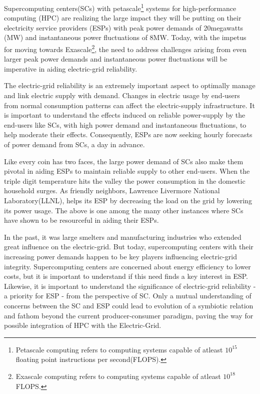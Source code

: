 Supercomputing centers(SCs) with petascale\footnote{Petascale computing refers to computing systems capable of atleast \(10^{15}\) floating point instructions per second(FLOPS).} systems for high-performance computing (HPC) are realizing the large impact they will be putting on their electricity service providers (ESPs) with peak power demands of 20megawatts (MW) and instantaneous power fluctuations of 8MW. 
Today, with the impetus for moving towards Exascale\footnote{Exascale computing refers to computing systems capable of atleast \(10^{18}\)FLOPS.}, the need to address challenges arising from even larger peak power demands and instantaneous power fluctuations will be imperative in aiding electric-grid reliability.

The electric-grid reliability is an extremely important aspect to optimally manage and link electric supply with demand. Changes in electric usage by end-users from normal consumption patterns can affect the electric-supply infrastructure. 
It is important to understand the effects induced on reliable power-supply by the end-users like SCs, with high power demand and instantaneous fluctuations, to help moderate their effects. 
Consequently, ESPs are now seeking hourly forecasts of power demand from SCs, a day in advance.

Like every coin has two faces, the large power demand of SCs also make them pivotal in aiding ESPs to maintain reliable supply to other end-users. 
When the triple digit temperature hits the valley the power consumption in the domestic household surges. 
As friendly neighbors, Lawrence Livermore National Laboratory(LLNL), helps its ESP by decreasing the load on the grid by lowering its power usage. 
The above is one among the many other instances where SCs have shown to be resourceful in aiding their ESPs.

In the past, it was large smelters and manufacturing industries who extended great influence on the electric-grid. 
But today, supercomputing centers with their increasing power demands happen to be key players influencing electric-grid integrity.
Supercomputing centers are concerned about energy efficiency to lower costs, but it is important to understand if this need finds a key interest in ESP.
Likewise, it is important to understand the significance of electric-grid reliability - a priority for ESP - from the perspective of SC. 
Only a mutual understanding of concerns between the SC and ESP could lead to evolution of a symbiotic relation and fathom beyond the current producer-consumer paradigm, paving the way for possible integration of HPC with the Electric-Grid.

